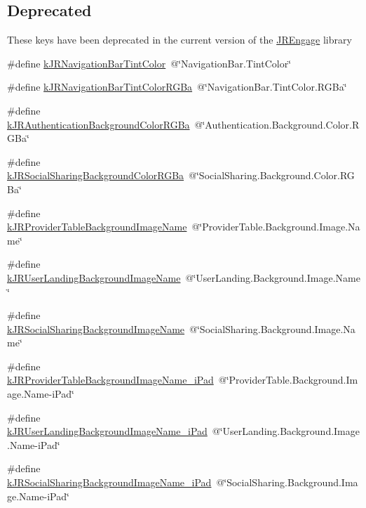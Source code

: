 \subsection*{Deprecated}
\label{_amgrp0ac54cb10e7494cff1949826e8e32f7b}
 These keys have been deprecated in the current version of the \hyperlink{class_j_r_engage}{JREngage} library \begin{DoxyCompactItemize}
\item 
\#define \hyperlink{group__custom_interface_ga7c7ed7dac155537c9bc14531c5cec3cb}{kJRNavigationBarTintColor}~@\char`\"{}NavigationBar.TintColor\char`\"{}
\item 
\#define \hyperlink{group__custom_interface_gabda4f66c5cde44bbeaa6a993f4793ac5}{kJRNavigationBarTintColorRGBa}~@\char`\"{}NavigationBar.TintColor.RGBa\char`\"{}
\item 
\#define \hyperlink{group__custom_interface_gae0c84a976949aa4eccecc123786efb3c}{kJRAuthenticationBackgroundColorRGBa}~@\char`\"{}Authentication.Background.Color.RGBa\char`\"{}
\item 
\#define \hyperlink{group__custom_interface_ga6554a101f0e2e9474a77262143dc528b}{kJRSocialSharingBackgroundColorRGBa}~@\char`\"{}SocialSharing.Background.Color.RGBa\char`\"{}
\item 
\#define \hyperlink{group__custom_interface_ga893fb6e20be0c6658e81a6a5d5c121f0}{kJRProviderTableBackgroundImageName}~@\char`\"{}ProviderTable.Background.Image.Name\char`\"{}
\item 
\#define \hyperlink{group__custom_interface_gadda3f945ba5012762eb92764b251b918}{kJRUserLandingBackgroundImageName}~@\char`\"{}UserLanding.Background.Image.Name\char`\"{}
\item 
\#define \hyperlink{group__custom_interface_gad2e00942af19ec9478ba58a491a8b8f2}{kJRSocialSharingBackgroundImageName}~@\char`\"{}SocialSharing.Background.Image.Name\char`\"{}
\item 
\#define \hyperlink{group__custom_interface_ga25b26cff96d8f174f3bdc040031466b7}{kJRProviderTableBackgroundImageName\_\-iPad}~@\char`\"{}ProviderTable.Background.Image.Name-\/iPad\char`\"{}
\item 
\#define \hyperlink{group__custom_interface_ga52b4fb3801cf3fe6e5a294d9a4d1ff0a}{kJRUserLandingBackgroundImageName\_\-iPad}~@\char`\"{}UserLanding.Background.Image.Name-\/iPad\char`\"{}
\item 
\#define \hyperlink{group__custom_interface_ga646cb35f3a7ec2835872ee6df2aceb76}{kJRSocialSharingBackgroundImageName\_\-iPad}~@\char`\"{}SocialSharing.Background.Image.Name-\/iPad\char`\"{}

\end{DoxyCompactItemize}
